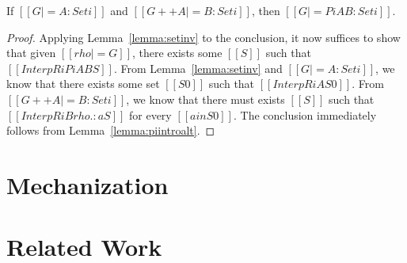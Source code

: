 \documentclass[nonacm]{acmart}
\begin{document}
\begin{lemma}[ST-Pi]
  If $[[G |= A : Set i]]$ and $[[G ++ A |= B : Set i]]$, then $[[G |= Pi
  A B : Set i]]$.
\end{lemma}
\begin{proof}
  Applying Lemma~\ref{lemma:setinv} to the
  conclusion, it now suffices to show that given $[[rho |= G]]$, there
  exists some $[[S]]$ such that $[[InterpR i Pi A B S]]$.
  From Lemma~\ref{lemma:setinv} and $[[G |= A : Set i]]$, we know that
  there exists some set $[[S0]]$ such that $[[InterpR i A S0]]$.
From $[[G ++ A |= B : Set i]]$, we know that there must
exists $[[S]]$ such that $[[InterpR i B {rho .: a} S]]$ for every $[[a
in S0]]$. The conclusion immediately follows from Lemma~\ref{lemma:piintroalt}.
\end{proof}

\section{Mechanization}
\label{sec:logrelmech}

\section{Related Work}
\label{sec:relatedwork}








\end{document}
